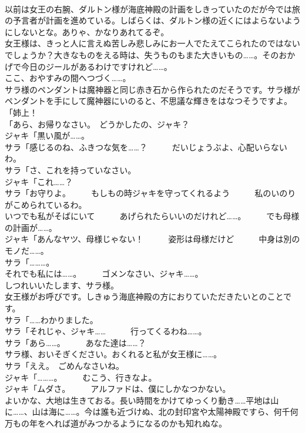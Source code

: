 \documentclass[8pt]{extreport}
\begin{document}
\begin{CJK}{UTF8}{min}
\\	以前は女王の右腕、ダルトン様が海底神殿の計画をしきっていたのだが今では旅の予言者が計画を進めている。しばらくは、ダルトン様の近くにはよらないようにしないとな。ありゃ、かなりあれてるぞ。	
\\	女王様は、きっと人に言えぬ苦しみ悲しみにお一人でたえてこられたのではないでしょうか？大きなものをえる時は、失うものもまた大きいもの……。そのおかげで今日のジールがあるわけですけれど……。	
\\	ここ、おやすみの間へつづく……。	
\\	サラ様のペンダントは魔神器と同じ赤き石から作られたのだそうです。サラ様がペンダントを手にして魔神器にいのると、不思議な輝きをはなつそうですよ。	
\\	「姉上！	
\\	「あら、お帰りなさい。　どうかしたの、ジャキ？	
\\	ジャキ「黒い風が……。	
\\	サラ「感じるのね、ふきつな気を……？　　　だいじょうぶよ、心配いらないわ。	
\\	サラ「さ、これを持っていなさい。	
\\	ジャキ「これ……？	
\\	サラ「お守りよ。　　　もしもの時ジャキを守ってくれるよう　　　私のいのりがこめられているわ。	
\\	いつでも私がそばにいて　　　あげられたらいいのだけれど……。　　　でも母様の計画が……。	
\\	ジャキ「あんなヤツ、母様じゃない！　　　姿形は母様だけど　　　中身は別のモノだ……。	
\\	サラ「………。	
\\	それでも私には……。　　　ゴメンなさい、ジャキ……。	
\\	しつれいいたします、サラ様。	
\\	女王様がお呼びです。しきゅう海底神殿の方におりていただきたいとのことです。	
\\	サラ「……わかりました。	
\\	サラ「それじゃ、ジャキ……　　　行ってくるわね……。	
\\	サラ「あら……。　　　あなた達は……？	
\\	サラ様、おいそぎください。おくれると私が女王様に……。	
\\	サラ「ええ。　ごめんなさいね。	
\\	ジャキ「………。　　　むこう、行きなよ。	
\\	ジャキ「ムダさ。　　　アルファドは、僕にしかなつかない。	
\\	よいかな、大地は生きておる。長い時間をかけてゆっくり動き……平地は山に……、山は海に……。今は誰も近づけぬ、北の封印宮や太陽神殿ですら、何千何万もの年をへれば道がみつかるようになるのかも知れぬな。	

\end{CJK}
\end{document}
